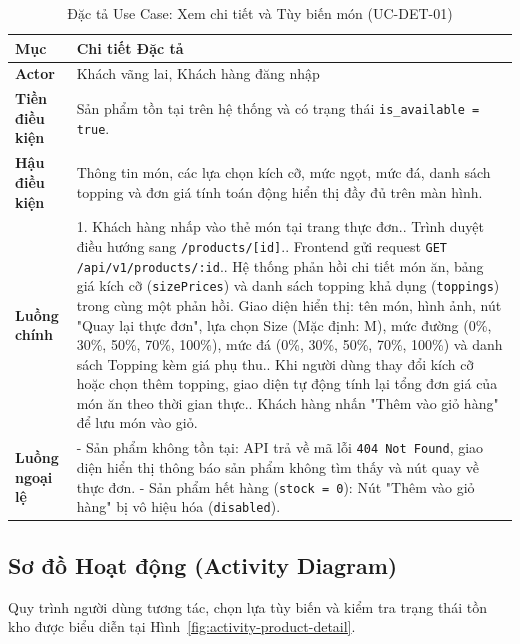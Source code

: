 \begin{table}[htbp]
\centering
\small
\caption{Đặc tả Use Case: Xem chi tiết và Tùy biến món (UC-DET-01)}
\label{tab:uc-spec-detail}
\begin{tabularx}{\textwidth}{p{2.8cm}X}
\toprule
\textbf{Mục} & \textbf{Chi tiết Đặc tả} \\
\midrule
\textbf{Actor} & Khách vãng lai, Khách hàng đăng nhập \\
\midrule
\textbf{Tiền điều kiện} & Sản phẩm tồn tại trên hệ thống và có trạng thái \texttt{is\_available = true}. \\
\midrule
\textbf{Hậu điều kiện} & Thông tin món, các lựa chọn kích cỡ, mức ngọt, mức đá, danh sách topping và đơn giá tính toán động hiển thị đầy đủ trên màn hình. \\
\midrule
\textbf{Luồng chính} & 
1. Khách hàng nhấp vào thẻ món tại trang thực đơn.\newline
2. Trình duyệt điều hướng sang \texttt{/products/[id]}.\newline
3. Frontend gửi request \texttt{GET /api/v1/products/:id}.\newline
4. Hệ thống phản hồi chi tiết món ăn, bảng giá kích cỡ (\texttt{sizePrices}) và danh sách topping khả dụng (\texttt{toppings}) trong cùng một phản hồi. Giao diện hiển thị: tên món, hình ảnh, nút "Quay lại thực đơn", lựa chọn Size (Mặc định: M), mức đường (0\%, 30\%, 50\%, 70\%, 100\%), mức đá (0\%, 30\%, 50\%, 70\%, 100\%) và danh sách Topping kèm giá phụ thu.\newline
5. Khi người dùng thay đổi kích cỡ hoặc chọn thêm topping, giao diện tự động tính lại tổng đơn giá của món ăn theo thời gian thực.\newline
6. Khách hàng nhấn "Thêm vào giỏ hàng" để lưu món vào giỏ. \\
\midrule
\textbf{Luồng ngoại lệ} & 
- Sản phẩm không tồn tại: API trả về mã lỗi \texttt{404 Not Found}, giao diện hiển thị thông báo sản phẩm không tìm thấy và nút quay về thực đơn.\newline
- Sản phẩm hết hàng (\texttt{stock = 0}): Nút "Thêm vào giỏ hàng" bị vô hiệu hóa (\texttt{disabled}). \\
\bottomrule
\end{tabularx}
\end{table}

\subsection{Sơ đồ Hoạt động (Activity Diagram)}
Quy trình người dùng tương tác, chọn lựa tùy biến và kiểm tra trạng thái tồn kho được biểu diễn tại Hình~\ref{fig:activity-product-detail}.


